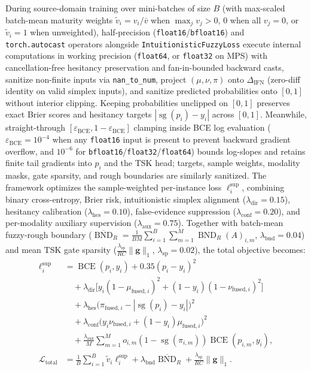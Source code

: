 \documentclass[10pt,twocolumn]{article}
\begin{document}
During source-\allowbreak domain training over mini-batches of size $B$ (with max-scaled
batch-mean maturity weights $\tilde{v}_i = v_i / \bar{v}$ when $\max_j v_j > 0$, $0$ when all
$v_j = 0$, or $\tilde{v}_i = 1$ when unweighted), half-precision
(\texttt{float16}/\texttt{bfloat16}) and \texttt{torch.autocast} operators alongside
\texttt{Intuitionistic\allowbreak Fuzzy\allowbreak Loss} execute internal computations in
working precision (\texttt{float64}, or \texttt{float32} on MPS) with cancellation-free
hesitancy preservation and fan-in-bounded backward casts, sanitize non-finite inputs via
\texttt{nan\_to\_num}, project $(\mu,\nu,\pi)$ onto $\Delta_{\text{IFN}}$ (zero-diff identity
on valid simplex inputs), and sanitize predicted probabilities onto $[0,1]$ without interior
clipping. Keeping probabilities unclipped on $[0,1]$ preserves exact Brier scores and hesitancy
targets $|\operatorname{sg}(p_i)-y_i|$ across $[0,1]$. Meanwhile, straight-through
$[\varepsilon_{\text{BCE}}, 1-\varepsilon_{\text{BCE}}]$ clamping inside BCE log evaluation
($\varepsilon_{\text{BCE}}=10^{-4}$ when any \texttt{float16} input is present to prevent
backward gradient overflow, and $10^{-6}$ for
\texttt{bfloat16}/\texttt{float32}/\texttt{float64}) bounds log-slopes and retains finite tail
gradients into $p_i$ and the TSK head; targets, sample weights, modality masks, gate sparsity,
and rough boundaries are similarly sanitized. The framework optimizes the sample-weighted
per-instance loss $\ell_i^{\text{sup}}$, combining binary cross-\allowbreak entropy, Brier
risk, intuitionistic simplex alignment ($\lambda_{\text{dir}}=0.15$), hesitancy calibration
($\lambda_{\text{hes}}=0.10$), false-evidence suppression ($\lambda_{\text{conf}}=0.20$), and
per-modality auxiliary supervision ($\lambda_{\text{aux}}=0.75$). Together with batch-mean
fuzzy-rough boundary ($\overline{\operatorname{BND}}_R = \frac{1}{BM}\sum_{i=1}^B\sum_{m=1}^M
\operatorname{BND}_R(A)_{i,m}$, $\lambda_{\text{bnd}}=0.04$) and mean TSK gate sparsity
($\frac{\lambda_{\text{sp}}}{RC}\|\bm{g}\|_1$, $\lambda_{\text{sp}}=0.02$), the total objective
becomes:
\begin{equation}
\label{eq:total_loss}
\begin{aligned}
\ell_i^{\text{sup}} &= \operatorname{BCE}(p_i, y_i) + 0.35 (p_i - y_i)^2 \\
&\quad + \lambda_{\text{dir}}\big[y_i(1-\mu_{\text{fused},i})^2 +
(1-y_i)(1-\nu_{\text{fused},i})^2\big] \\
&\quad + \lambda_{\text{hes}}\big(\pi_{\text{fused},i} - |\operatorname{sg}(p_i) - y_i|\big)^2
\\
&\quad + \lambda_{\text{conf}}\big(y_i\nu_{\text{fused},i} + (1-y_i)\mu_{\text{fused},i}\big)^2
\\
&\quad + \frac{\lambda_{\text{aux}}}{M}\sum_{m=1}^M o_{i,m} (1 -
\operatorname{sg}(\pi_{i,m}))\operatorname{BCE}(p_{i,m}, y_i), \\
\mathcal{L}_{\text{total}} &= \frac{1}{B}\sum_{i=1}^B \tilde{v}_i \ell_i^{\text{sup}} +
\lambda_{\text{bnd}}\overline{\operatorname{BND}}_R +
\frac{\lambda_{\text{sp}}}{RC}\|\bm{g}\|_1.
\end{aligned}
\end{equation}
\end{document}

